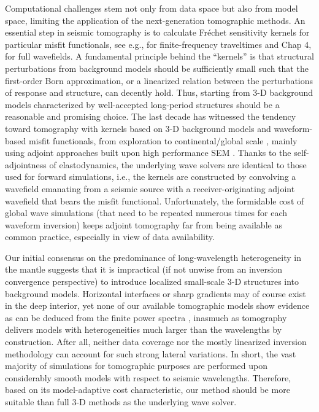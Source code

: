 \documentclass[extra]{gji}
\begin{document}
Computational challenges stem not only from data space 
but also from model space, limiting the application 
of the next-generation tomographic methods.
An essential step in seismic tomography is to calculate  
Fr\'{e}chet sensitivity kernels
for particular misfit functionals, see e.g., \cite{dahlen2000frechet}
for finite-frequency traveltimes and Chap 4, \cite{nolet2008breviary}
for full wavefields. 
A fundamental principle behind the ``kernels'' is that 
structural perturbations from background models
should be sufficiently small such that the first-order
Born approximation, or a linearized relation between the perturbations of 
response and structure, can decently hold. 
Thus, starting from 3-D background models characterized by well-accepted 
long-period structures should be a reasonable and promising choice.
The last decade has witnessed the tendency toward  
tomography with kernels based on 3-D background models and waveform-based misfit
functionals, from exploration 
\cite[e.g.,][]{plessix2006review, luo2009seismic}
to continental/global scale
\cite[e.g.,][]{liu2008finite, tape2009adjoint, fichtner2008theoretical, colombi2014seismic}, 
mainly using adjoint approaches \cite[]{tarantola1988theoretical,
tromp2005seismic} built upon high performance 
SEM \cite[]{komatitsch2002spectralI, peter2011forward}.
Thanks to the self-adjointness of elastodynamics, the underlying wave solvers are
identical to those used for forward simulations, i.e., the kernels are 
constructed by convolving a wavefield emanating from a seismic source with a
receiver-originating adjoint wavefield that bears the misfit functional.
Unfortunately, the formidable cost of global wave simulations
(that need to be repeated numerous times for each waveform inversion) 
keeps adjoint tomography far from being 
available as common practice, especially in view of data availability.

Our initial consensus on the predominance of long-wavelength 
heterogeneity in the mantle \cite[]{su1991predominance} suggests that
it is impractical (if not unwise from an inversion convergence
perspective) to introduce localized small-scale 3-D structures
into background models. 
Horizontal interfaces or sharp gradients may of course exist in the deep interior, 
yet none of our available tomographic models show evidence as can be 
deduced from the finite power spectra \cite[]{becker2002comparison},
inasmuch as tomography delivers models with heterogeneities much larger than the
wavelengths by construction.
After all, neither data coverage nor the mostly linearized inversion 
methodology can account for such strong lateral variations.
In short, the vast majority of simulations for tomographic purposes are
performed upon considerably smooth models with respect to seismic 
wavelengths. Therefore, based on its model-adaptive cost characteristic, 
our method should be more suitable than full 3-D methods 
as the underlying wave solver.   
\end{document}
